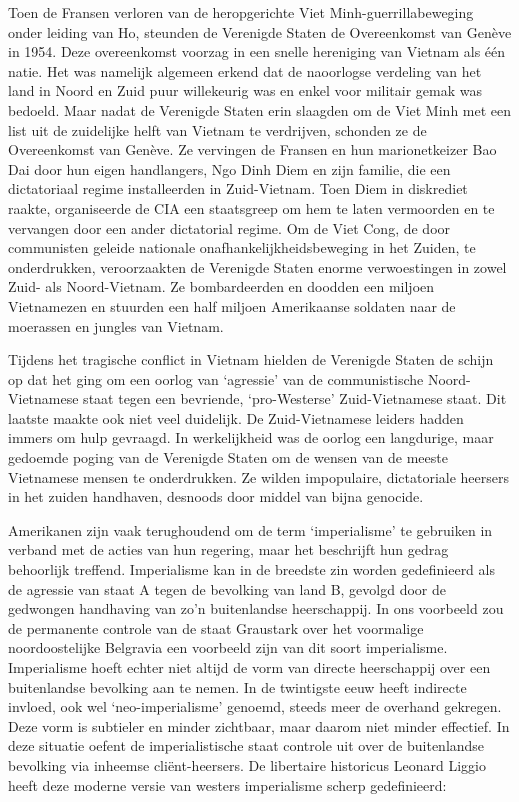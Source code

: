 \documentclass[
  a5paper,
  smalldemyvopaper,10pt,twoside,onecolumn,openright,extrafontsizes,hidelinks]{memoir}
\begin{document}
Toen de Fransen verloren van de heropgerichte Viet
Minh-guerrillabeweging onder leiding van Ho, steunden de Verenigde
Staten de Overeenkomst van Genève in 1954. Deze overeenkomst voorzag in
een snelle hereniging van Vietnam als één natie. Het was namelijk
algemeen erkend dat de naoorlogse verdeling van het land in Noord en
Zuid puur willekeurig was en enkel voor militair gemak was bedoeld. Maar
nadat de Verenigde Staten erin slaagden om de Viet Minh met een list uit
de zuidelijke helft van Vietnam te verdrijven, schonden ze de
Overeenkomst van Genève. Ze vervingen de Fransen en hun marionetkeizer
Bao Dai door hun eigen handlangers, Ngo Dinh Diem en zijn familie, die
een dictatoriaal regime installeerden in Zuid-Vietnam. Toen Diem in
diskrediet raakte, organiseerde de CIA een staatsgreep om hem te laten
vermoorden en te vervangen door een ander dictatorial regime. Om de Viet
Cong, de door communisten geleide nationale onafhankelijkheidsbeweging
in het Zuiden, te onderdrukken, veroorzaakten de Verenigde Staten enorme
verwoestingen in zowel Zuid- als Noord-Vietnam. Ze bombardeerden en
doodden een miljoen Vietnamezen en stuurden een half miljoen Amerikaanse
soldaten naar de moerassen en jungles van Vietnam.

Tijdens het tragische conflict in Vietnam hielden de Verenigde Staten de
schijn op dat het ging om een oorlog van `agressie' van de
communistische Noord-Vietnamese staat tegen een bevriende,
`pro-Westerse' Zuid-Vietnamese staat. Dit laatste maakte ook niet veel
duidelijk. De Zuid-Vietnamese leiders hadden immers om hulp gevraagd. In
werkelijkheid was de oorlog een langdurige, maar gedoemde poging van de
Verenigde Staten om de wensen van de meeste Vietnamese mensen te
onderdrukken. Ze wilden impopulaire, dictatoriale heersers in het zuiden
handhaven, desnoods door middel van bijna genocide.

Amerikanen zijn vaak terughoudend om de term `imperialisme' te gebruiken
in verband met de acties van hun regering, maar het beschrijft hun
gedrag behoorlijk treffend. Imperialisme kan in de breedste zin worden
gedefinieerd als de agressie van staat A tegen de bevolking van land B,
gevolgd door de gedwongen handhaving van zo'n buitenlandse heerschappij.
In ons voorbeeld zou de permanente controle van de staat Graustark over
het voormalige noordoostelijke Belgravia een voorbeeld zijn van dit
soort imperialisme. Imperialisme hoeft echter niet altijd de vorm van
directe heerschappij over een buitenlandse bevolking aan te nemen. In de
twintigste eeuw heeft indirecte invloed, ook wel `neo-imperialisme'
genoemd, steeds meer de overhand gekregen. Deze vorm is subtieler en
minder zichtbaar, maar daarom niet minder effectief. In deze situatie
oefent de imperialistische staat controle uit over de buitenlandse
bevolking via inheemse cliënt-heersers. De libertaire historicus Leonard
Liggio heeft deze moderne versie van westers imperialisme scherp
gedefinieerd:
\end{document}
